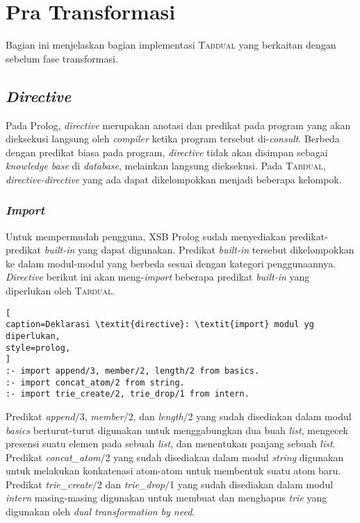 \section{Pra Transformasi}

Bagian ini menjelaskan bagian implementasi \textsc{Tabdual} yang berkaitan dengan sebelum fase transformasi.

\subsection{\textit{Directive}}

Pada Prolog, \textit{directive} merupakan anotasi dan predikat pada program yang akan dieksekusi langsung oleh \textit{compiler} ketika program tersebut di-\textit{consult}. Berbeda dengan predikat biasa pada program, \textit{directive} tidak akan disimpan sebagai \textit{knowledge base} di \textit{database}, melainkan langsung dieksekusi. Pada \textsc{Tabdual}, \textit{directive-directive} yang ada dapat dikelompokkan menjadi beberapa kelompok.

\subsubsection{\textit{Import}}

Untuk mempermudah pengguna, XSB Prolog sudah menyediakan predikat-predikat \textit{built-in} yang dapat digunakan. Predikat \textit{built-in} tersebut dikelompokkan ke dalam modul-modul yang berbeda sesuai dengan kategori penggunaannya. \textit{Directive} berikut ini akan meng-\textit{import} beberapa predikat \textit{built-in} yang diperlukan oleh \textsc{Tabdual}.
\\

\begin{lstlisting}[
caption=Deklarasi \textit{directive}: \textit{import} modul yg diperlukan,
style=prolog,
]
:- import append/3, member/2, length/2 from basics.
:- import concat_atom/2 from string.
:- import trie_create/2, trie_drop/1 from intern.
\end{lstlisting}

Predikat \textit{append$/$}3, \textit{member$/$}2, dan \textit{length$/$}2 yang sudah disediakan dalam modul \textit{basics} berturut-turut digunakan untuk menggabungkan dua buah \textit{list}, mengecek presensi suatu elemen pada sebuah \textit{list}, dan menentukan panjang sebuah \textit{list}. Predikat \textit{concat\_atom$/$}2 yang sudah disediakan dalam modul \textit{string} digunakan untuk melakukan konkatenasi atom-atom untuk membentuk suatu atom baru. Predikat \textit{trie\_create$/$}2 dan \textit{trie\_drop$/$}1 yang sudah disediakan dalam modul \textit{intern} masing-masing digunakan untuk membuat dan menghapus \textit{trie} yang digunakan oleh \textit{dual transformation by need}.

